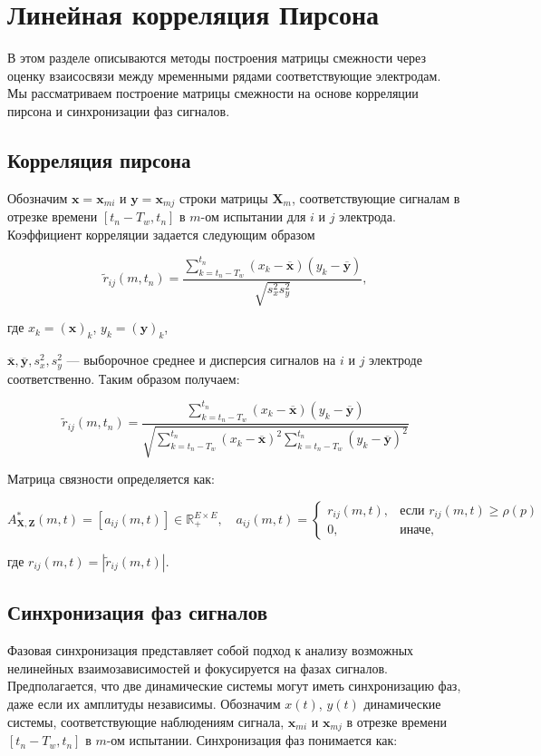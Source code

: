 \documentclass[12pt, twoside]{article}
\begin{document}
\section{Линейная корреляция Пирсона}

В этом разделе описываются методы построения матрицы смежности через оценку взаисосвязи между мременными рядами соответствующие электродам. Мы рассматриваем построение матрицы смежности на основе корреляции пирсона и синхронизации фаз сигналов.

\subsection{Корреляция пирсона}

Обозначим $\mathbf{x} = \mathbf{x}_{mi}$ и $\mathbf{y} = \mathbf{x}_{mj}$ строки матрицы $\mathbf{X}_m$, соответствующие сигналам в отрезке времени $[t_n - T_w, t_n]$ в $m$-ом испытании для $i$ и $j$ электрода. Коэффициент корреляции задается следующим образом


\[
\tilde{r}_{ij}(m, t_n) = \frac{\sum_{k=t_n-T_w}^{t_n} (x_k - \overline{\mathbf{x}})(y_k - \overline{\mathbf{y}})}{\sqrt{s_x^2 s_y^2}},
\]

где $x_k = (\mathbf{x})_k$, $y_k = (\mathbf{y})_k$,

$\overline{\mathbf{x}}, \overline{\mathbf{y}}, s_x^2, s_y^2$ — выборочное среднее и дисперсия сигналов на $i$ и $j$ электроде соответственно. Таким образом получаем:

$$
\tilde{r}_{ij}(m, t_n) = \frac{\sum_{k=t_n-T_w}^{t_n} (x_k - \overline{\mathbf{x}})(y_k - \overline{\mathbf{y}})}{\sqrt{\sum_{k=t_n-T_w}^{t_n} (x_k - \overline{\mathbf{x}})^2 \sum_{k=t_n-T_w}^{t_n} (y_k - \overline{\mathbf{y}})^2}}
$$

Матрица связности определяется как:

\begin{equation}
A_{\mathbf{X}, \mathbf{Z}}^*(m, t) = [a_{ij}(m, t)] \in \mathbb{R}_+^{E \times E}, \quad a_{ij}(m, t) = 
\begin{cases}
r_{ij}(m, t), & \text{если } r_{ij}(m, t) \geq \rho(p) \\
0, & \text{иначе},
\end{cases}
\end{equation}

где $r_{ij}(m, t) = |\tilde{r}_{ij}(m, t)|$.

\subsection{Синхронизация фаз сигналов}
Фазовая синхронизация представляет собой подход к анализу возможных нелинейных взаимозависимостей и фокусируется на фазах сигналов. Предполагается, что две динамические системы могут иметь синхронизацию фаз, даже если их амплитуды независимы. Обозначим $x(t)$, $y(t)$ динамические системы, соответствующие наблюдениям сигнала, $\mathbf{x}_{mi}$ и $\mathbf{x}_{mj}$ в отрезке времени $[t_n - T_w, t_n]$ в $m$-ом испытании. Синхронизация фаз понимается как:
\end{document}

